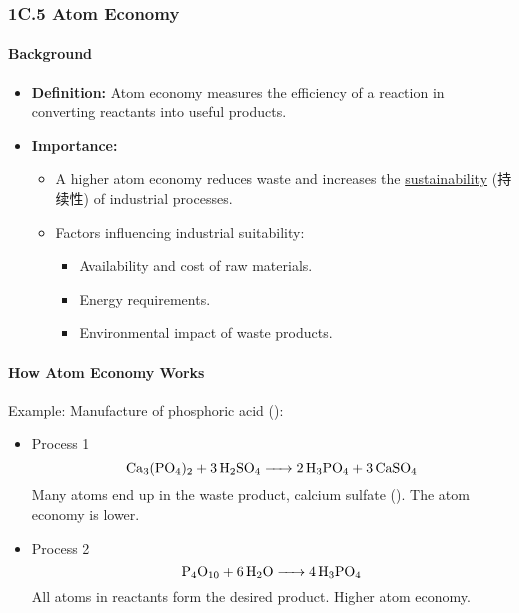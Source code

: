 
\subsubsection{1C.5 Atom Economy}
\paragraph{Background}
\begin{itemize}
    \item \textbf{Definition:} Atom economy measures the efficiency of a reaction in converting reactants into useful products.
    \item \textbf{Importance:}
    \begin{itemize}
        \item A higher atom economy reduces waste and increases the \underline{sustainability} (持续性) of industrial processes.
        \item Factors influencing industrial suitability:
        \begin{itemize}
            \item Availability and cost of raw materials.
            \item Energy requirements.
            \item Environmental impact of waste products.
        \end{itemize}
    \end{itemize}
\end{itemize}

\paragraph{How Atom Economy Works}
Example: Manufacture of phosphoric acid ():
\begin{itemize}
    \item Process 1
    \begin{equation}
        \ce{Ca3(PO4)2 + 3H2SO4 -> 2H3PO4 + 3CaSO4}
    \end{equation}
    Many atoms end up in the waste product, calcium sulfate (). The atom economy is lower.
    \item Process 2
    \begin{equation}
        \ce{P4O10 + 6H2O -> 4H3PO4}
    \end{equation}
    All atoms in reactants form the desired product. Higher atom economy.
\end{itemize}

